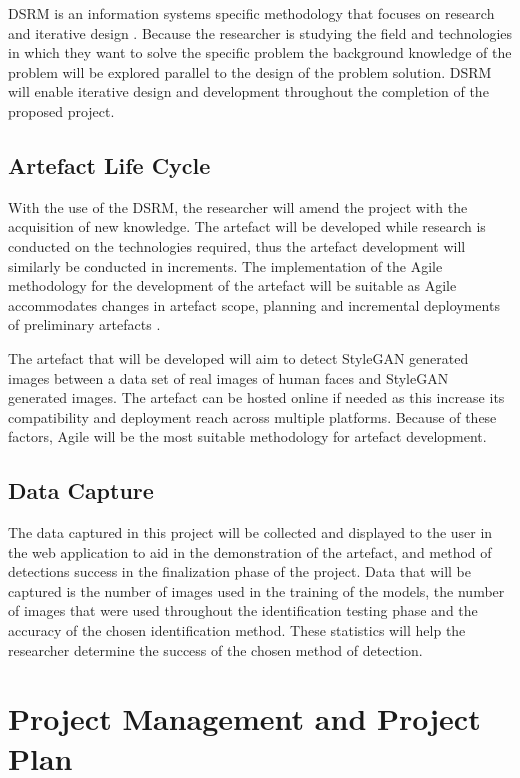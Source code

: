 DSRM is an information systems specific methodology that focuses on research and iterative design \citep{Peffers2007}. Because the researcher is studying the field and technologies in which they want to solve the specific problem the background knowledge of the problem will be explored parallel to the design of the problem solution. DSRM will enable iterative design and development throughout the completion of the proposed project.

\subsection{Artefact Life Cycle}

With the use of the DSRM, the researcher will amend the project with the acquisition of new knowledge. The artefact will be developed while research is conducted on the technologies required, thus the artefact development will similarly be conducted in increments. The implementation of the Agile methodology for the development of the artefact will be suitable as Agile accommodates changes in artefact scope, planning and incremental deployments of preliminary artefacts \citep{Weiyin2011}.

The artefact that will be developed will aim to detect StyleGAN generated images between a data set of real images of human faces and StyleGAN generated images. The artefact can be hosted online if needed as this increase its compatibility and deployment reach across multiple platforms. Because of these factors, Agile will be the most suitable methodology for artefact development. 

\subsection{Data Capture}

The data captured in this project will be collected and displayed to the user in the web application to aid in the demonstration of the artefact, and method of detections success in the finalization phase of the project. Data that will be captured is the number of images used in the training of the models, the number of images that were used throughout the identification testing phase and the accuracy of the chosen identification method. These statistics will help the researcher determine the success of the chosen method of detection.

\section{Project Management and Project Plan}


